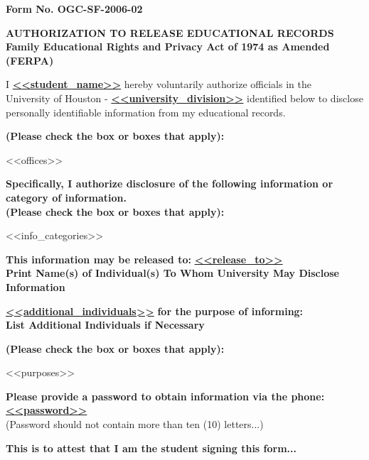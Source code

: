 \documentclass[12pt]{article}
\begin{document}
\noindent \textbf{Form No. OGC-SF-2006-02}

\begin{center}
    {\fontsize{11pt}{13pt} \selectfont \textbf{AUTHORIZATION TO RELEASE EDUCATIONAL RECORDS}}\\
    {\fontsize{11pt}{13pt} \selectfont \textbf{Family Educational Rights and Privacy Act of 1974 as Amended (FERPA)}}
\end{center}

I \underline{\textbf{<<student_name>>}} hereby voluntarily authorize officials in the\\


University of Houston - \underline{\textbf{<<university_division>>}} identified below to disclose personally identifiable information from my educational records.

\textbf{(Please check the box or boxes that apply):}
\begin{list}{}{\leftmargin=0pt \itemindent=0pt \setlength{\itemsep}{0pt}}
    <<offices>>
\end{list}

\textbf{Specifically, I authorize disclosure of the following information or category of information.}\\
\textbf{(Please check the box or boxes that apply):}
\begin{list}{}{\leftmargin=0pt \itemindent=0pt \setlength{\itemsep}{0pt}}
    <<info_categories>>
\end{list}

\textbf{This information may be released to:} \underline{\textbf{<<release_to>>}}\\
\textbf{Print Name(s) of Individual(s) To Whom University May Disclose Information}

\underline{\textbf{<<additional_individuals>>}} \textbf{for the purpose of informing:}\\
\textbf{List Additional Individuals if Necessary}

\textbf{(Please check the box or boxes that apply):}
\begin{list}{}{\leftmargin=0pt \itemindent=0pt \setlength{\itemsep}{0pt}}
    <<purposes>>
\end{list}

\textbf{Please provide a password to obtain information via the phone:} \underline{\textbf{<<password>>}}\\
\footnotesize (Password should not contain more than ten (10) letters...)

\vspace{0.3cm}
\textbf{This is to attest that I am the student signing this form...}
\end{document}
